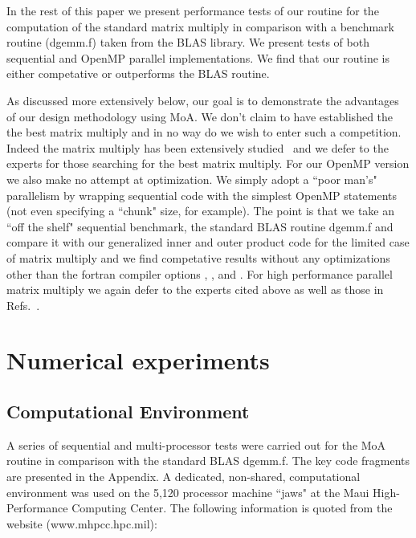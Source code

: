 \documentclass[aps,prl,twocolumn,groupedaddress,floatfix]{revtex4}
\begin{document}
In the rest of this paper we present performance tests of our routine for 
the computation of the standard matrix multiply in comparison with a benchmark 
routine (dgemm.f) taken from the BLAS library.  We present tests of both
sequential and OpenMP parallel implementations.  We find that our 
routine is either competative or outperforms the BLAS routine. 

As discussed more extensively below, our goal is to demonstrate the 
advantages of our design methodology using MoA.  We don't claim to have 
established the the best matrix multiply and in no way do we wish to 
enter such a competition.  Indeed the matrix multiply has been extensively
studied~\cite{dongarra88a,dongarra88b,dongarra90a,dongarra90b,blackford02,
whaley01,gunnels01,gunnels05,gunnels06,vandegeijn97,
low05,bientinesi05a,bientinesi05b,lawson79a,lawson79b,anderson99} and we 
defer to the experts for those searching for the best matrix multiply.  For 
our OpenMP version we also make no attempt at optimization.  We simply adopt a 
``poor man's" parallelism by wrapping sequential code with the simplest
OpenMP statements (not even specifying a ``chunk" size, for example).  The
point is that we take an ``off the shelf" sequential benchmark, the 
standard BLAS routine dgemm.f and compare it with our generalized inner
and outer product code for the limited case of matrix multiply and we find
competative results without any optimizations other than the fortran 
compiler options , ,  and .  For high performance 
parallel matrix multiply we again defer to the experts cited above as well
as those in Refs.~\citep{bentz05,addison,santos03,bilmes97,demmel05,bernsten89,
choi94,lederman93a,li01,irony04}.


\section{Numerical experiments}

\subsection{Computational Environment}
A series of sequential and multi-processor tests were carried out for 
the MoA routine in comparison with the standard BLAS dgemm.f.  
The key code fragments are presented in the Appendix.
A dedicated, non-shared, computational environment was used on the 
5,120 processor machine ``jaws" at the Maui High-Performance Computing Center.  The following
information is quoted from the website (www.mhpcc.hpc.mil):
\end{document}
